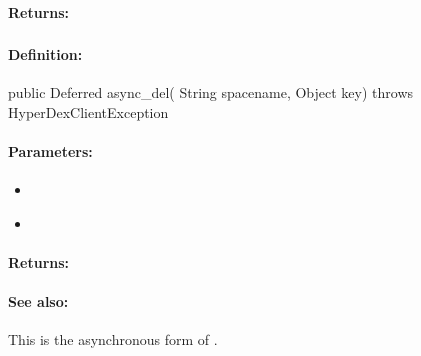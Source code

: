 \paragraph{Returns:}


\pagebreak
\subsubsection{}
\label{api:java:async_del}


\paragraph{Definition:}
\begin{javacode}
public Deferred async_del(
        String spacename,
        Object key) throws HyperDexClientException
\end{javacode}

\paragraph{Parameters:}
\begin{itemize}[noitemsep]
\item {}\\

\item {}\\

\end{itemize}

\paragraph{Returns:}


\paragraph{See also:}  This is the asynchronous form of .

\pagebreak
\subsubsection{}
\label{api:java:cond_del}


